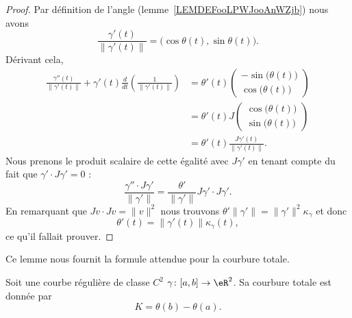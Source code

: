 \begin{proof}
	Par définition de l'angle (lemme~\ref{LEMDEFooLPWJooAnWZjb}) nous avons
	\begin{equation}
		\frac{ \gamma'(t) }{ \| \gamma'(t) \| }=\big( \cos\theta(t),\sin\theta(t) \big).
	\end{equation}
	Dérivant cela,
	\begin{subequations}
		\begin{align}
			\frac{ \gamma''(t) }{ \| \gamma'(t) \| }+\gamma'(t)\frac{ d  }{ dt }\left( \frac{1}{ \| \gamma'(t) \| } \right) & =\theta'(t)
			\begin{pmatrix}
				-\sin\big( \theta(t) \big) \\
				\cos\big( \theta(t) \big)
			\end{pmatrix}                                                                                                                                            \\
			                                                                                                                & =\theta'(t)J\begin{pmatrix}
				\cos\big( \theta(t) \big) \\
				\sin\big( \theta(t) \big)
			\end{pmatrix}              \\
			                                                                                                                & =\theta'(t)\frac{ J\gamma'(t) }{ \| \gamma'(t) \| }.
		\end{align}
	\end{subequations}
	Nous prenons le produit scalaire de cette égalité avec \( J\gamma'\) en tenant compte du fait que \( \gamma'\cdot J\gamma'=0\) :
	\begin{equation}
		\frac{ \gamma''\cdot J\gamma' }{ \| \gamma' \| }=\frac{ \theta' }{ \| \gamma' \| }J\gamma'\cdot J\gamma'.
	\end{equation}
	En remarquant que \( Jv\cdot Jv=\| v \|^2\) nous trouvons \( \theta'\| \gamma' \|=\| \gamma' \|^2\kappa_{\gamma}\) et donc
	\begin{equation}
		\theta'(t)=\| \gamma'(t) \|\kappa_{\gamma}(t),
	\end{equation}
	ce qu'il fallait prouver.
\end{proof}
Ce lemme nous fournit la formule attendue pour la courbure totale.

\begin{lemma}
	Soit une courbe régulière de classe \( C^2\) \( \gamma\colon \mathopen[ a , b \mathclose]\to \eR^2\). Sa courbure totale est donnée par
	\begin{equation}
		K=\theta(b)-\theta(a).
	\end{equation}
\end{lemma}

